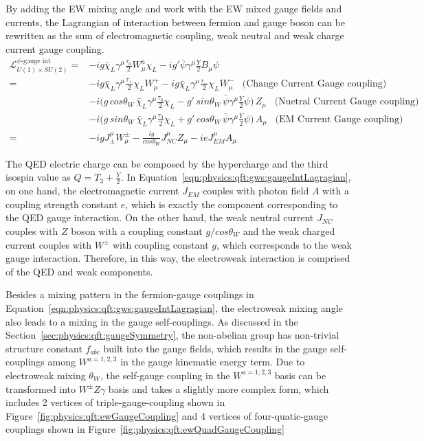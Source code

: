 \noindent By adding the EW mixing angle and work with the EW mixed gauge fields and currents, the Lagrangian of interaction between fermion and gauge boson can be rewritten as the sum of electromagnetic coupling, weak neutral and weak charge current gauge coupling.
\begin{equation}
\begin{split}
    \mathcal{L}_{U(1)\times SU(2)}^{\text{$\psi$-gauge int}} 
    =& -ig \bar{\chi}_L  \gamma^\mu \frac{\tau_a}{2} W^a_\mu \chi_L - ig' \bar{\psi}  \gamma^\mu \frac{Y}{2} B_\mu \psi  \\
    =& -ig \bar{\chi}_L  \gamma^\mu \frac{\tau_+}{2} \chi_L W^+_\mu -ig \bar{\chi}_L  \gamma^\mu \frac{\tau_-}{2} \chi_L W^-_\mu  \;\;\; \text{(Change Current Gauge coupling)} \\
    & -i \big( g\,cos\theta_W \,  \bar{\chi}_L \gamma^\mu   \frac{\tau_3}{2} \chi_L - g'\,sin\theta_W \,  \bar{\psi} \gamma^\mu   \frac{Y}{2} \psi \big)  \, Z_\mu  \;\;\; \text{(Nuetral Current Gauge coupling)} \\
    & -i \big( g\,sin\theta_W \,  \bar{\chi}_L \gamma^\mu   \frac{\tau_3}{2} \chi_L + g'\,cos\theta_W \,  \bar{\psi} \gamma^\mu   \frac{Y}{2} \psi \big)  \, A_\mu  \;\;\; \text{(EM Current Gauge coupling)}\\
    = &-ig J^\mu_\pm W_\mu^\pm - \frac{ig}{cos\theta_W} J^\mu_{NC} Z_\mu - ie J^{\mu}_{EM} A_\mu
\end{split}
\label{eqn:physics:qft:gws:gaugeIntLagragian}
\end{equation}

\noindent The QED electric charge can be composed by the hypercharge and the third isospin value as $Q = T_3  +\frac{Y}{2}$. In Equation~\ref{eqn:physics:qft:gws:gaugeIntLagragian}, on one hand, the electromagnetic current $J_{EM}$ couples with photon field $A$ with a coupling strength constant $e$, which is exactly the component corresponding to the QED gauge interaction. On the other hand, the weak neutral current $J_{NC}$ couples with $Z$ boson with a coupling constant $g/cos\theta_W$ and the weak charged current couples with $W^\pm$ with coupling constant $g$, which corresponds to the weak gauge interaction. Therefore, in this way, the electroweak interaction is comprised of the QED and weak components.

Besides a mixing pattern in the fermion-gauge couplings in Equation~\ref{eqn:physics:qft:gws:gaugeIntLagragian}, the electroweak mixing angle also leads to a mixing in the gauge self-couplings.  As discussed in the Section~\ref{sec:physics:qft:gaugeSymmetry}, the non-abelian group has non-trivial structure constant $f_{abc}$ built into the gauge fields, which results in the gauge self-couplings among $W^{a=1,2,3}$ in the gauge kinematic energy term. Due to electroweak mixing $\theta_W$, the self-gauge coupling in the $W^{a=1,2,3}$ basis can be transformed into $W^\pm Z \gamma$ basis and takes a slightly more complex form, which includes 2 vertices of triple-gauge-coupling shown in Figure~\ref{fig:physics:qft:ewGaugeCoupling} and 4 vertices of four-quatic-gauge couplings shown in Figure~\ref{fig:physics:qft:ewQuadGaugeCoupling}


